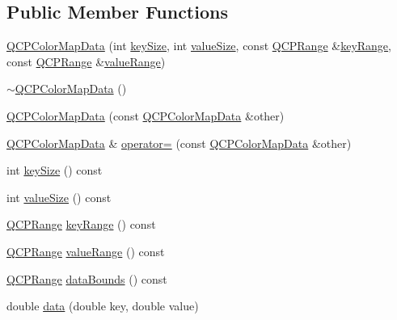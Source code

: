 \subsection*{Public Member Functions}
\begin{DoxyCompactItemize}
\item 
\hyperlink{class_q_c_p_color_map_data_aac9d8eb81e18e240d89d56c01933fd23}{Q\+C\+P\+Color\+Map\+Data} (int \hyperlink{class_q_c_p_color_map_data_aa8d7811686fdfea964947715210c4af8}{key\+Size}, int \hyperlink{class_q_c_p_color_map_data_ab880be6bc587f34e8d22fe77ef6b57e9}{value\+Size}, const \hyperlink{class_q_c_p_range}{Q\+C\+P\+Range} \&\hyperlink{class_q_c_p_color_map_data_a4765180639742460f64ab6c97c745c08}{key\+Range}, const \hyperlink{class_q_c_p_range}{Q\+C\+P\+Range} \&\hyperlink{class_q_c_p_color_map_data_a025be4d7ba0494fd7b38a5a56c737f2a}{value\+Range})
\item 
\hyperlink{class_q_c_p_color_map_data_a7ac252031d0921520d5bccb6bfa23a8b}{$\sim$\+Q\+C\+P\+Color\+Map\+Data} ()
\item 
\hyperlink{class_q_c_p_color_map_data_a7f2145d86473263494abb9bf1de20436}{Q\+C\+P\+Color\+Map\+Data} (const \hyperlink{class_q_c_p_color_map_data}{Q\+C\+P\+Color\+Map\+Data} \&other)
\item 
\hyperlink{class_q_c_p_color_map_data}{Q\+C\+P\+Color\+Map\+Data} \& \hyperlink{class_q_c_p_color_map_data_afdf4dd1b2f5714234fe84709b85c2a8d}{operator=} (const \hyperlink{class_q_c_p_color_map_data}{Q\+C\+P\+Color\+Map\+Data} \&other)
\item 
int \hyperlink{class_q_c_p_color_map_data_aa8d7811686fdfea964947715210c4af8}{key\+Size} () const 
\item 
int \hyperlink{class_q_c_p_color_map_data_ab880be6bc587f34e8d22fe77ef6b57e9}{value\+Size} () const 
\item 
\hyperlink{class_q_c_p_range}{Q\+C\+P\+Range} \hyperlink{class_q_c_p_color_map_data_a4765180639742460f64ab6c97c745c08}{key\+Range} () const 
\item 
\hyperlink{class_q_c_p_range}{Q\+C\+P\+Range} \hyperlink{class_q_c_p_color_map_data_a025be4d7ba0494fd7b38a5a56c737f2a}{value\+Range} () const 
\item 
\hyperlink{class_q_c_p_range}{Q\+C\+P\+Range} \hyperlink{class_q_c_p_color_map_data_a9ff433248ee226ea0c469ae6cc2489fd}{data\+Bounds} () const 
\item 
double \hyperlink{class_q_c_p_color_map_data_a2c33807b008cdb9e1394245c294c0eaf}{data} (double key, double value)
\item 

\end{DoxyCompactItemize}
